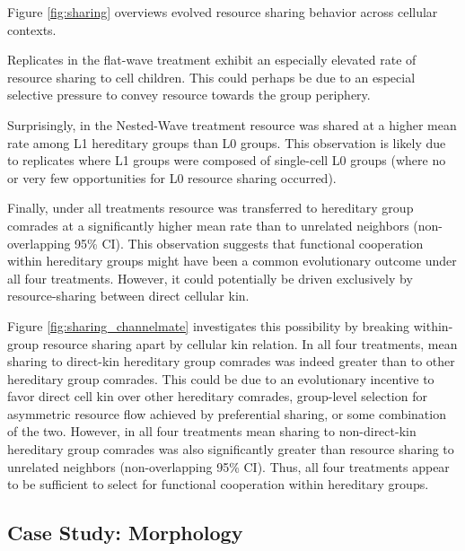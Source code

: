 


Figure \ref{fig:sharing} overviews evolved resource sharing behavior across cellular contexts.

Replicates in the flat-wave treatment exhibit an especially elevated rate of resource sharing to cell children.
This could perhaps be due to an especial selective pressure to convey resource towards the group periphery.

Surprisingly, in the Nested-Wave treatment resource was shared at a higher mean rate among L1 hereditary groups than L0 groups.
This observation is likely due to replicates where L1 groups were composed of single-cell L0 groups (where no or very few opportunities for L0 resource sharing occurred).

Finally, under all treatments resource was transferred to hereditary group comrades at a significantly higher mean rate than to unrelated neighbors (non-overlapping 95\% CI).
This observation suggests that functional cooperation within hereditary groups might have been a common evolutionary outcome under all four treatments.
However, it could potentially be driven exclusively by resource-sharing between direct cellular kin.

Figure \ref{fig:sharing_channelmate} investigates this possibility by breaking within-group resource sharing apart by cellular kin relation.
In all four treatments, mean sharing to direct-kin hereditary group comrades was indeed greater than to other hereditary group comrades.
This could be due to an evolutionary incentive to favor direct cell kin over other hereditary comrades, group-level selection for asymmetric resource flow achieved by preferential sharing, or some combination of the two.
However, in all four treatments mean sharing to non-direct-kin hereditary group comrades was also significantly greater than resource sharing to unrelated neighbors (non-overlapping 95\% CI).
Thus, all four treatments appear to be sufficient to select for functional cooperation within hereditary groups.

\subsection{Case Study: Morphology} \label{sec:morphology}



